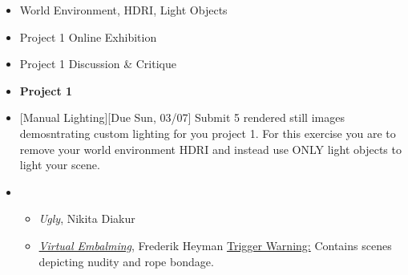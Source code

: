 \def\dMon{Mon, 03/01}
\def\dTues{Tues, 03/02}
\def\dWed{Wed, 03/03}
\def\dThur{Thur, 03/04}
\def\dFri{Fri, 03/05}
\def\dSat{Sat, 03/06}
\def\dSun{Sun, 03/07}
\placeDate

\begin{itemize}[noitemsep,topsep=0pt,leftmargin=*]
    \item {} World Environment, HDRI, Light Objects
    \item Project 1 Online Exhibition
    \item Project 1 Discussion \& Critique
    \item \textcolor{defaultColor}{\textbf{Project 1 \due{Due \dTues}}}
    \item {}[Manual Lighting][Due \dSun] Submit 5 rendered still images demosntrating custom lighting for you project 1. For this exercise you are to remove your world environment HDRI and instead use ONLY light objects to light your scene.  \discordE
    \item {}
          \begin{itemize}
              \item \emph{Ugly}, Nikita Diakur
              \item \href{https://www.nowness.com/story/virtual-embalming-frederik-heyman}{\emph{Virtual Embalming}}, Frederik Heyman \newline
                    \small{\ul{Trigger Warning:} Contains scenes depicting nudity and rope bondage.}
          \end{itemize}
\end{itemize}